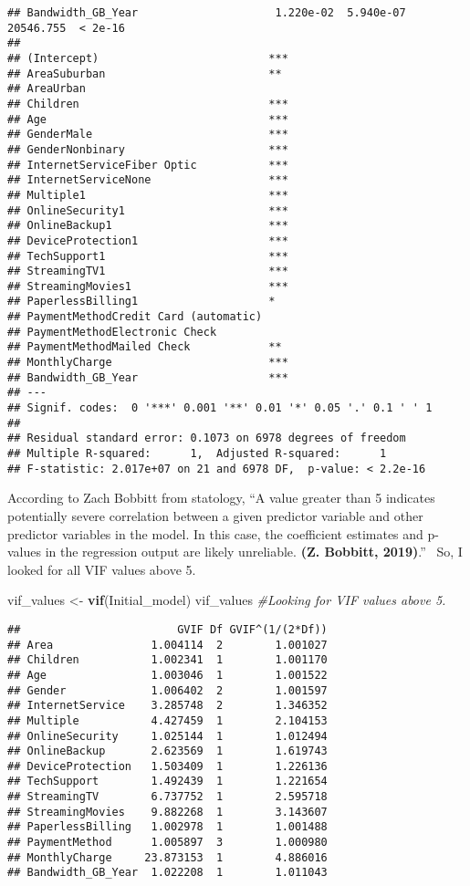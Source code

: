 \documentclass[
]{article}
\newenvironment{Shaded}{\begin{snugshade}}{\end{snugshade}}
\newcommand{\CommentTok}[1]{\textcolor[rgb]{0.56,0.35,0.01}{\textit{#1}}}
\newcommand{\FunctionTok}[1]{\textcolor[rgb]{0.13,0.29,0.53}{\textbf{#1}}}
\newcommand{\NormalTok}[1]{#1}
\newcommand{\OtherTok}[1]{\textcolor[rgb]{0.56,0.35,0.01}{#1}}
\begin{document}
\begin{verbatim}
## Bandwidth_GB_Year                     1.220e-02  5.940e-07 20546.755  < 2e-16
##                                         
## (Intercept)                          ***
## AreaSuburban                         ** 
## AreaUrban                               
## Children                             ***
## Age                                  ***
## GenderMale                           ***
## GenderNonbinary                      ***
## InternetServiceFiber Optic           ***
## InternetServiceNone                  ***
## Multiple1                            ***
## OnlineSecurity1                      ***
## OnlineBackup1                        ***
## DeviceProtection1                    ***
## TechSupport1                         ***
## StreamingTV1                         ***
## StreamingMovies1                     ***
## PaperlessBilling1                    *  
## PaymentMethodCredit Card (automatic)    
## PaymentMethodElectronic Check           
## PaymentMethodMailed Check            ** 
## MonthlyCharge                        ***
## Bandwidth_GB_Year                    ***
## ---
## Signif. codes:  0 '***' 0.001 '**' 0.01 '*' 0.05 '.' 0.1 ' ' 1
## 
## Residual standard error: 0.1073 on 6978 degrees of freedom
## Multiple R-squared:      1,  Adjusted R-squared:      1 
## F-statistic: 2.017e+07 on 21 and 6978 DF,  p-value: < 2.2e-16
\end{verbatim}

According to Zach Bobbitt from statology, ``A value greater than 5
indicates potentially severe correlation between a given predictor
variable and other predictor variables in the model. In this case, the
coefficient estimates and p-values in the regression output are likely
unreliable. \textbf{(Z. Bobbitt, 2019)}.''~ So, I looked for all VIF
values above 5.

\begin{Shaded}
\begin{Highlighting}[]
\NormalTok{vif\_values }\OtherTok{\textless{}{-}} \FunctionTok{vif}\NormalTok{(Initial\_model)}
\NormalTok{vif\_values }\CommentTok{\#Looking for VIF values above 5. }
\end{Highlighting}
\end{Shaded}

\begin{verbatim}
##                        GVIF Df GVIF^(1/(2*Df))
## Area               1.004114  2        1.001027
## Children           1.002341  1        1.001170
## Age                1.003046  1        1.001522
## Gender             1.006402  2        1.001597
## InternetService    3.285748  2        1.346352
## Multiple           4.427459  1        2.104153
## OnlineSecurity     1.025144  1        1.012494
## OnlineBackup       2.623569  1        1.619743
## DeviceProtection   1.503409  1        1.226136
## TechSupport        1.492439  1        1.221654
## StreamingTV        6.737752  1        2.595718
## StreamingMovies    9.882268  1        3.143607
## PaperlessBilling   1.002978  1        1.001488
## PaymentMethod      1.005897  3        1.000980
## MonthlyCharge     23.873153  1        4.886016
## Bandwidth_GB_Year  1.022208  1        1.011043
\end{verbatim}
\end{document}
